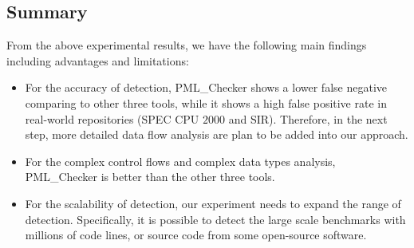 \subsection{Summary}
From the above experimental results, we have the following main findings including advantages and limitations: 
\begin{itemize}
\item 
For the accuracy of detection, PML\_Checker shows a lower false negative comparing to other three tools, while it shows a high false positive rate in real-world repositories (SPEC CPU $2000$ and SIR). Therefore, in the next step, more detailed data flow analysis are plan to be added into our approach.
\item 
For the complex control flows and complex data types analysis, PML\_Checker is better than the other three tools.
\item 
For the scalability of detection, our experiment needs to expand the range of detection. Specifically, it is possible to detect the large scale benchmarks with millions of code lines, or source code from some open-source software.
\end{itemize}
